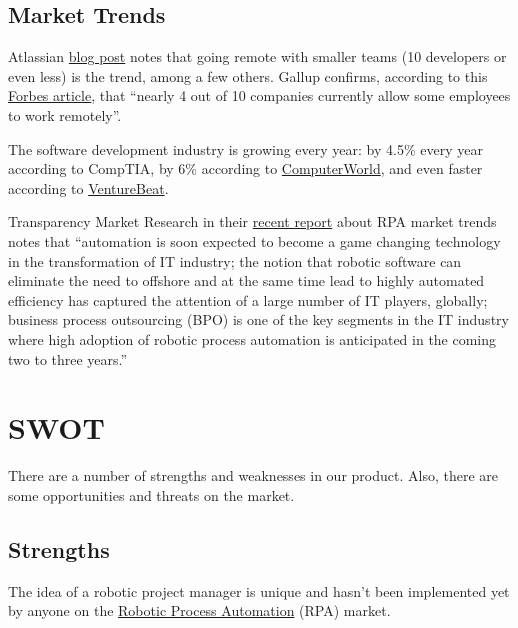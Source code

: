 \documentclass[12pt]{article}
\begin{document}
\subsection{Market Trends}

Atlassian \href{https://blogs.atlassian.com/2016/03/software-development-trends-2016/}{blog post}
notes that going remote with smaller teams (10 developers or
even less) is the trend, among a few others. Gallup confirms, according to this
\href{https://www.forbes.com/sites/davidsturt/2014/05/14/working-remotely-does-the-research-prove-it-wont-work-for-you/#9a6518966ac4}{Forbes article},
that ``nearly 4 out of 10 companies currently allow some
employees to work remotely''.

The software development industry is growing every year: by 4.5\% every year
according to CompTIA, by 6\% according to \href{http://www.computerworld.com/article/2502348/it-management/it-jobs-will-grow-22--through-2020--says-u-s-.html}{ComputerWorld},
and even faster
according to \href{http://venturebeat.com/2013/10/17/listen-up-investors-the-software-industry-is-growing-quickly-and-in-unexpected-places/}{VentureBeat}.

Transparency Market Research in their \href{http://www.transparencymarketresearch.com/it-robotic-automation-market.html}{recent report} about RPA market trends
notes that ``automation is soon expected to become a game changing technology in
the transformation of IT industry; the notion that robotic software can
eliminate the need to offshore and at the same time lead to highly automated
efficiency has captured the attention of a large number of IT players, globally;
business process outsourcing (BPO) is one of the key segments in the IT industry
where high adoption of robotic process automation is anticipated in the coming
two to three years.''

\section{SWOT}

There are a number of strengths and weaknesses in our product. Also, there are
some opportunities and threats on the market.

\subsection{Strengths}

The idea of a robotic project manager is unique and hasn't been implemented yet
by anyone on the \href{https://en.wikipedia.org/wiki/Robotic_Process_Automation}{Robotic Process Automation} (RPA) market.
\end{document}
